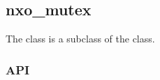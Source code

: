 %
%
%
%
%              

\subsection{nxo\_mutex}
\label{nxo_mutex}

The  class is a subclass of the  class.

\subsubsection{API}
